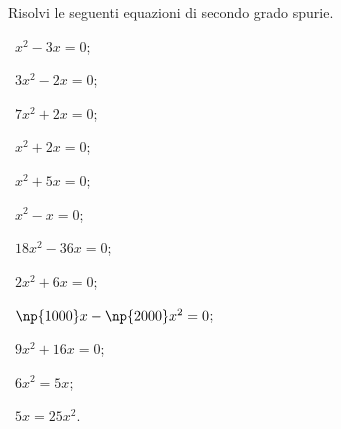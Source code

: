 \begin{esercizio}[\Ast]
\label{ese:3.5}
Risolvi le seguenti equazioni di secondo grado spurie.
\begin{multicols}{3}
 \begin{enumeratea}
 \item~$x^{2} - 3 x = 0$;
 \item~$3 x^{2} - 2 x = 0$;
 \item~$7 x^{2} + 2 x = 0$;
 \item~$x^{2} + 2 x = 0$;
 \item~$x^{2} + 5 x = 0$;
 \item~$x^{2} - x = 0$;
 \item~$18 x^{2} - 36 x = 0$;
 \item~$2x^{2} + 6x = 0$;
 \item~$\np{1000} x - \np{2000} x^{2} = 0$;
 \item~$9x^{2} + 16x = 0$;
 \item~$6 x^{2} = 5 x$;
 \item~$5x = 25x^{2}$.
 \end{enumeratea}
 \end{multicols}
\end{esercizio}


